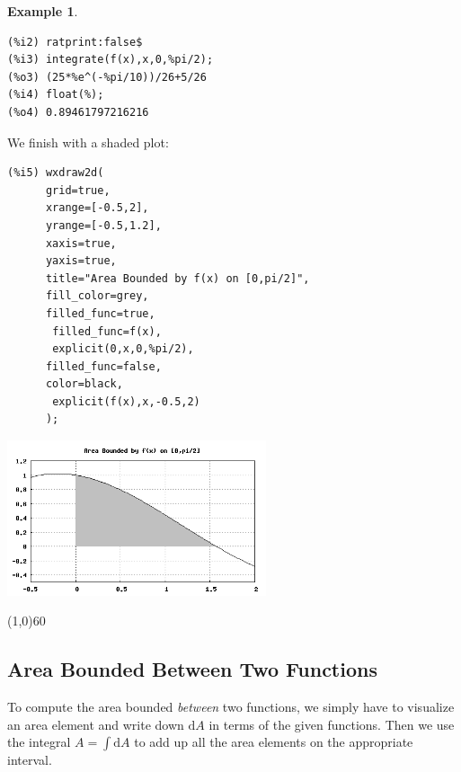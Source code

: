 \documentclass[10.5pt,twoside]{report}
\theoremstyle{definition}
\newtheorem{exmp}{Example}[section]
\begin{document}
\begin{exmp}
\begin{verbatim}
(%i2) ratprint:false$
(%i3) integrate(f(x),x,0,%pi/2);
(%o3) (25*%e^(-%pi/10))/26+5/26
(%i4) float(%);
(%o4) 0.89461797216216
\end{verbatim}


We finish with a shaded plot:


\begin{verbatim}
(%i5) wxdraw2d(
      grid=true,
      xrange=[-0.5,2],
      yrange=[-0.5,1.2],
      xaxis=true,
      yaxis=true,
      title="Area Bounded by f(x) on [0,pi/2]",
      fill_color=grey,
      filled_func=true,
       filled_func=f(x),
       explicit(0,x,0,%pi/2),
      filled_func=false,
      color=black,
       explicit(f(x),x,-0.5,2)
      );
\end{verbatim}

\includegraphics[width=3in]{example_3_1_1_2}
\end{exmp}

\line(1,0){60}
\linethickness{0.5mm}



\subsection{Area Bounded Between Two Functions}


To compute the area bounded \textit{between} two functions, we simply have to visualize an area element and write down $\mathrm{d}A$ in terms of the given functions.  Then we use the integral $A=\displaystyle \int \mathrm{d}A$ to add up all the area elements on the appropriate interval.
\end{document}
